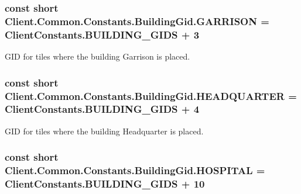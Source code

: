 \hypertarget{classClient_1_1Common_1_1Constants_1_1BuildingGid_aa9addbf69a0104b5a094391689421680}{}
\subsubsection[{G\+A\+R\+R\+I\+S\+O\+N}]{\setlength{\rightskip}{0pt plus 5cm}const short Client.\+Common.\+Constants.\+Building\+Gid.\+G\+A\+R\+R\+I\+S\+O\+N = {\bf Client\+Constants.\+B\+U\+I\+L\+D\+I\+N\+G\+\_\+\+G\+I\+D\+S} + 3}\label{classClient_1_1Common_1_1Constants_1_1BuildingGid_aa9addbf69a0104b5a094391689421680}


G\+I\+D for tiles where the building Garrison is placed. 

\hypertarget{classClient_1_1Common_1_1Constants_1_1BuildingGid_abd82ad0a2b6ce332d3ac57dd74dcd56d}{}
\subsubsection[{H\+E\+A\+D\+Q\+U\+A\+R\+T\+E\+R}]{\setlength{\rightskip}{0pt plus 5cm}const short Client.\+Common.\+Constants.\+Building\+Gid.\+H\+E\+A\+D\+Q\+U\+A\+R\+T\+E\+R = {\bf Client\+Constants.\+B\+U\+I\+L\+D\+I\+N\+G\+\_\+\+G\+I\+D\+S} + 4}\label{classClient_1_1Common_1_1Constants_1_1BuildingGid_abd82ad0a2b6ce332d3ac57dd74dcd56d}


G\+I\+D for tiles where the building Headquarter is placed. 

\hypertarget{classClient_1_1Common_1_1Constants_1_1BuildingGid_a74ffabb4007628c299979778aaeb53cd}{}
\subsubsection[{H\+O\+S\+P\+I\+T\+A\+L}]{\setlength{\rightskip}{0pt plus 5cm}const short Client.\+Common.\+Constants.\+Building\+Gid.\+H\+O\+S\+P\+I\+T\+A\+L = {\bf Client\+Constants.\+B\+U\+I\+L\+D\+I\+N\+G\+\_\+\+G\+I\+D\+S} + 10}\label{classClient_1_1Common_1_1Constants_1_1BuildingGid_a74ffabb4007628c299979778aaeb53cd}


